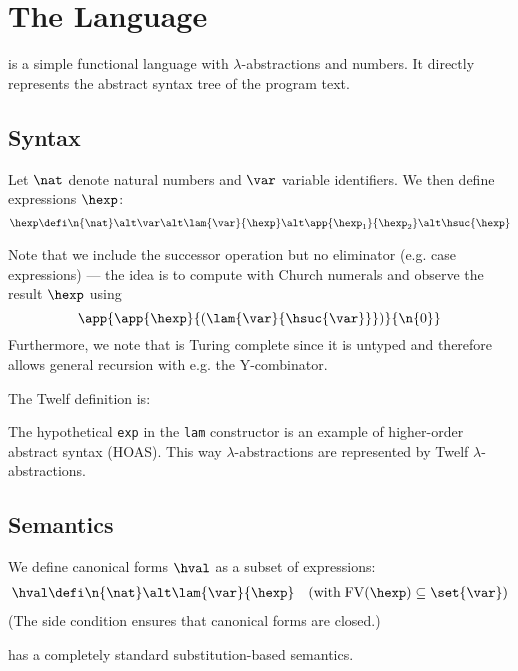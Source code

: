 \section{The \textnormal{\hlang} Language}

\hlang is a simple functional language with $\lambda$-abstractions and numbers.
It directly represents the abstract syntax tree of the program text.


\subsection{Syntax}

Let $\nat$ denote natural numbers and $\var$ variable identifiers. We then define \hlang expressions $\hexp$:
\begin{align*}
  \hexp &\defi \n{\nat} \alt \var \alt \lam{\var}{\hexp} \alt \app{\hexp_1}{\hexp_2} \alt \hsuc{\hexp} \\
\end{align*}

Note that we include the successor operation but no eliminator (e.g. case expressions) --- the idea is to compute with Church numerals and observe the result $\hexp$ using
\[
\app{\app{\hexp}{(\lam{\var}{\hsuc{\var}}})}{\n{0}}
\]
Furthermore, we note that \hlang is Turing complete since it is untyped and therefore allows general recursion with e.g. the Y-combinator.

\Twelf
The Twelf definition is:

The hypothetical \texttt{exp} in the \texttt{lam} constructor is an example of higher-order abstract syntax (HOAS).
This way \hlang $\lambda$-abstractions are represented by Twelf $\lambda$-abstractions.


\subsection{Semantics}

We define canonical forms $\hval$ as a subset of expressions:
\begin{align*}
  \hval &\defi \n{\nat} \alt \lam{\var}{\hexp} \quad (\text{with} \; \mathrm{FV}(\hexp) \subseteq \set{\var}) \\
\end{align*}
(The side condition ensures that canonical forms are closed.)

\hlang has a completely standard substitution-based semantics.

